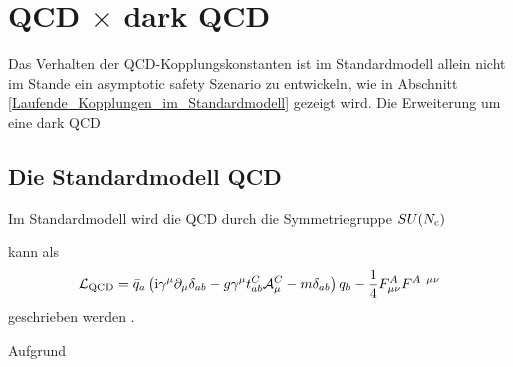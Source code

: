 \clearpage
\section{QCD $\times$ dark QCD}
  
  Das Verhalten der QCD-Kopplungskonstanten ist im Standardmodell allein nicht im 
  Stande ein asymptotic safety Szenario zu entwickeln, wie in Abschnitt 
  \ref{Laufende_Kopplungen_im_Standardmodell} gezeigt wird. Die Erweiterung um eine  
  dark QCD 
  
  \subsection{Die Standardmodell QCD}
    Im Standardmodell wird die QCD durch die Symmetriegruppe $SU(N_\text{c})$ 
    
    
    kann als 
    \begin{equation}
     \mathcal{L}_\text{QCD} = \bar{q}_a \left( 
     \text{i} \gamma^\mu \partial_\mu \delta_{ab} 
     -g \gamma^\mu t^C_{ab} \mathcal{A}_\mu^C
     -m \delta_{ab}
     \right)q_b -\frac{1}{4} F_{\mu \nu}^A F^{A \,\,\, \mu\nu}
    \end{equation}
    geschrieben werden \cite{PDG:QCD}. 
    
  
  
  
  
  Aufgrund\cite{Ade:2015xua}